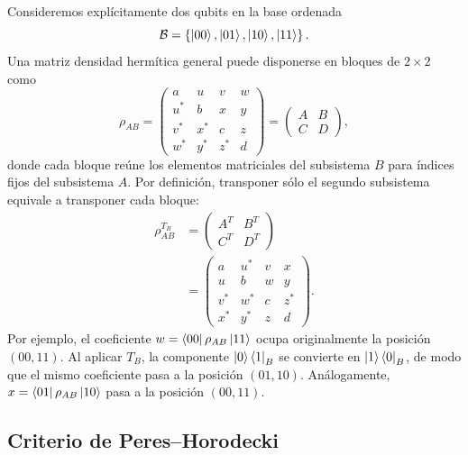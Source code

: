\documentclass[12pt,a4paper]{article}
\theoremstyle{definition}
\theoremstyle{plain}
\theoremstyle{remark}
\begin{document}
Consideremos explícitamente dos qubits en la base ordenada
\begin{equation*}
    \mathcal{B}=\left\{\ket{00},\ket{01},\ket{10},\ket{11}\right\}.
\end{equation*}
Una matriz densidad hermítica general puede disponerse en bloques de $2\times 2$ como
\begin{equation*}
    \rho_{AB}
    =
    \left(
    \begin{array}{cc|cc}
        a      & u      & v      & w \\
        u^{*}  & b      & x      & y \\
        \hline
        v^{*}  & x^{*}  & c      & z \\
        w^{*}  & y^{*}  & z^{*}  & d
    \end{array}
    \right)
    =
    \begin{pmatrix}
        A & B\\
        C & D
    \end{pmatrix},
\end{equation*}
donde cada bloque reúne los elementos matriciales del subsistema $B$ para índices fijos del subsistema $A$. Por definición, transponer sólo el segundo subsistema equivale a transponer cada bloque:
\begin{align*}
    \rho_{AB}^{T_B}
    &=
    \begin{pmatrix}
        A^{T} & B^{T}\\
        C^{T} & D^{T}
    \end{pmatrix}\\[0.2cm]
    &=
    \left(
    \begin{array}{cc|cc}
        a      & u^{*}  & v      & x \\
        u      & b      & w      & y \\
        \hline
        v^{*}  & w^{*}  & c      & z^{*} \\
        x^{*}  & y^{*}  & z      & d
    \end{array}
    \right).
\end{align*}
Por ejemplo, el coeficiente $w=\bra{00}\rho_{AB}\ket{11}$ ocupa originalmente la posición $(00,11)$. Al aplicar $T_B$, la componente $\ket{0}\bra{1}_B$ se convierte en $\ket{1}\bra{0}_B$, de modo que el mismo coeficiente pasa a la posición $(01,10)$. Análogamente, $x=\bra{01}\rho_{AB}\ket{10}$ pasa a la posición $(00,11)$.

\subsection{Criterio de Peres--Horodecki}
\end{document}
